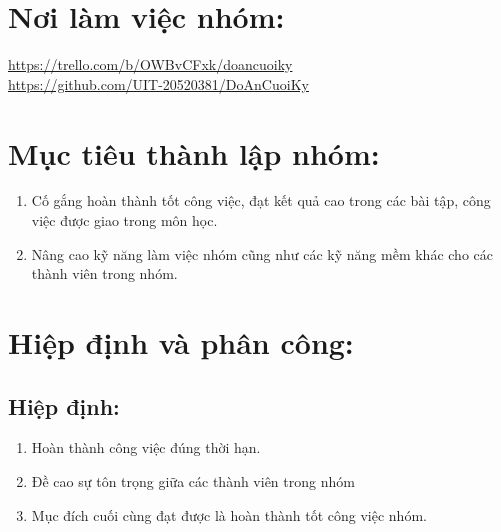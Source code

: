 \documentclass[a4paper,14pt]{extreport}
\begin{document}
\section{Nơi làm việc nhóm:}
\url{https://trello.com/b/OWBvCFxk/doancuoiky}\\
\url{https://github.com/UIT-20520381/DoAnCuoiKy}
\section{Mục tiêu thành lập nhóm:}
\begin{enumerate}[-]
\item Cố gắng hoàn thành tốt công việc, đạt kết quả cao trong các bài tập, công việc được giao trong môn học.
\item	Nâng cao kỹ năng làm việc nhóm cũng như các kỹ năng mềm khác cho các thành viên trong nhóm.
\end{enumerate}
\section{ Hiệp định và phân công:}
\subsection { Hiệp định:}
\begin{enumerate}[-]
\item Hoàn thành công việc đúng thời hạn.
\item Đề cao sự tôn trọng  giữa các thành viên trong nhóm
\item Mục đích cuối cùng đạt được là hoàn thành tốt công việc nhóm.
\end{enumerate}
\end{document}
